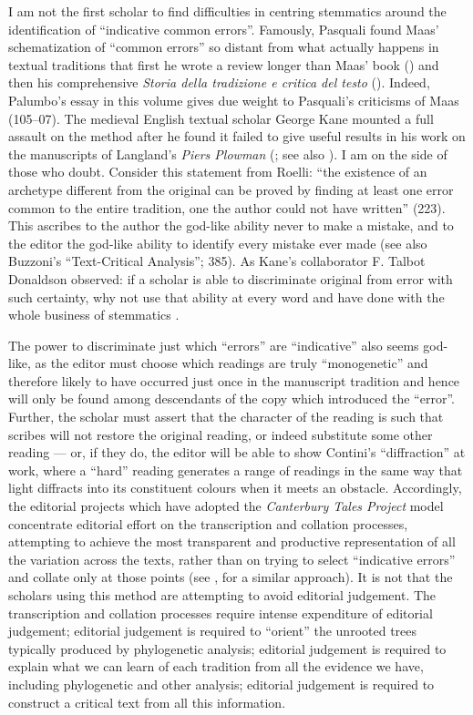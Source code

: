 \documentclass{article}
\begin{document}
I am not the first scholar to find difficulties in centring
stemmatics around the identification of ``indicative common errors''.
Famously, Pasquali found Maas' schematization of ``common errors'' so
distant from what actually happens in textual traditions that first he
wrote a review longer than Maas' book (\citeyear{pasquali_paul_1929}) and then his comprehensive
\emph{Storia della tradizione e critica del testo} (\citeyear{pasquali_storia_1934}). Indeed,
Palumbo's essay in this volume gives due weight to Pasquali's criticisms
of Maas (105--07). The medieval English textual scholar George Kane
mounted a full assault on the method after he found it failed to give
useful results in his work on the manuscripts of Langland's \emph{Piers
Plowman} (\cite{kane_john_1984}; see also \cite{langland_piers_1960,langland_piers_1975}). I am on the side of
those who doubt. Consider this statement from Roelli: ``the existence of
an archetype different from the original can be proved by finding at
least one error common to the entire tradition, one the author could not
have written'' (223). This ascribes to the author the god-like ability
never to make a mistake, and to the editor the god-like ability to
identify every mistake ever made (see also Buzzoni's ``Text-Critical
Analysis''; 385). As Kane's collaborator F. Talbot Donaldson observed:
if a scholar is able to discriminate original from error with such
certainty, why not use that ability at every word and have done with the
whole business of stemmatics \parencite[107]{donaldson_psychology_1970}.

The power to discriminate just which ``errors'' are ``indicative'' also
seems god-like, as the editor must choose which readings are truly
``monogenetic'' and therefore likely to have occurred just once in the
manuscript tradition and hence will only be found among descendants of
the copy which introduced the ``error''. Further, the scholar must
assert that the character of the reading is such that scribes will not
restore the original reading, or indeed substitute some other reading
–– or, if they do, the editor will be able to show Contini's
``diffraction'' at work, where a ``hard'' reading generates a range of
readings in the same way that light diffracts into its constituent
colours when it meets an obstacle. Accordingly, the editorial projects
which have adopted the \emph{Canterbury Tales Project} model concentrate
editorial effort on the transcription and collation processes,
attempting to achieve the most transparent and productive representation
of all the variation across the texts, rather than on trying to select
``indicative errors'' and collate only at those points (see \cite{andrews_analysis_2016}, for a similar approach). It is not that the scholars using this
method are attempting to avoid editorial judgement. The transcription
and collation processes require intense expenditure of editorial
judgement; editorial judgement is required to ``orient'' the unrooted
trees typically produced by phylogenetic analysis; editorial judgement
is required to explain what we can learn of each tradition from all the
evidence we have, including phylogenetic and other analysis; editorial
judgement is required to construct a critical text from all this
information.
\end{document}
